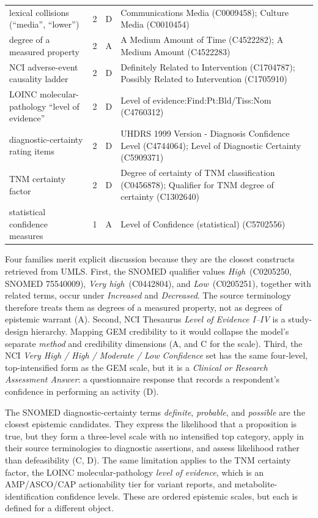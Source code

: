 \begin{table}[H]
\begin{tabularx}{\linewidth}{@{}>{\raggedright\arraybackslash}X r c >{\raggedright\arraybackslash}X@{}}
        lexical collisions (“media”, “lower”) & 2 & D & Communications Media (C0009458); Culture Media (C0010454) \\
        degree of a measured property & 2 & A & A Medium Amount of Time (C4522282); A Medium Amount (C4522283) \\
        NCI adverse-event causality ladder & 2 & D & Definitely Related to Intervention (C1704787); Possibly Related to Intervention (C1705910) \\
        LOINC molecular-pathology “level of evidence” & 2 & D & Level of evidence:Find:Pt:Bld/Tiss:Nom (C4760312) \\
        diagnostic-certainty rating items & 2 & D & UHDRS 1999 Version - Diagnosis Confidence Level (C4744064); Level of Diagnostic Certainty (C5909371) \\
        TNM certainty factor & 2 & D & Degree of certainty of TNM classification (C0456878); Qualifier for TNM degree of certainty (C1302640) \\
        statistical confidence measures & 1 & A & Level of Confidence (statistical) (C5702556) \\
    \bottomrule
  \end{tabularx}
\end{table}

Four families merit explicit discussion because they are the closest
constructs retrieved from UMLS. First, the SNOMED qualifier values
\emph{High}~(C0205250, SNOMED 75540009), \emph{Very high}~(C0442804), and
\emph{Low}~(C0205251), together with related terms, occur under
\emph{Increased} and \emph{Decreased}. The source terminology therefore
treats them as degrees of a measured property, not as degrees of epistemic
warrant (A). Second, NCI Thesaurus \emph{Level of Evidence I--IV} is a
study-design hierarchy. Mapping GEM credibility to it would collapse the
model's separate \emph{method} and credibility dimensions (A, and C for the
scale). Third, the NCI \emph{Very High / High / Moderate / Low Confidence}
set has the same four-level, top-intensified form as the GEM scale, but it is
a \emph{Clinical or Research Assessment Answer}: a questionnaire response
that records a respondent's confidence in performing an activity (D).

The SNOMED diagnostic-certainty terms \emph{definite}, \emph{probable}, and
\emph{possible} are the closest epistemic candidates. They express the
likelihood that a proposition is true, but they form a three-level scale with
no intensified top category, apply in their source terminologies to
diagnostic assertions, and assess likelihood rather than defeasibility (C,
D). The same limitation applies to the TNM certainty factor, the LOINC
molecular-pathology \emph{level of evidence}, which is an
AMP/ASCO/CAP actionability tier for variant reports, and
metabolite-identification confidence levels. These are ordered epistemic scales, but
each is defined for a different object.

